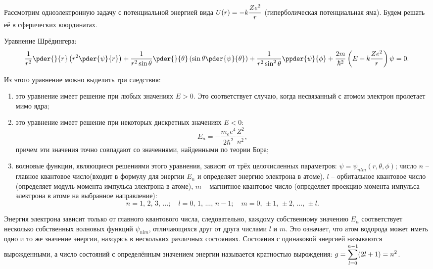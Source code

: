 
Рассмотрим одноэлектронную задачу с потенциальной энергией вида
\( \displaystyle U(r) = -k\frac{Ze^2}{r} \) (гиперболическая потенциальная яма). Будем
решать её в сферических координатах.

Уравнение Шрёдингера:
\[
    \frac{1}{r^2}\pder{}{r}\left(r^2\pder{\psi}{r}\right) + \frac{1}{r^2
    \sin\theta}\pder{}{\theta}\left(\sin\theta\pder{\psi}{\theta}\right) +
    \frac{1}{r^2\sin^2\theta}\ppder{\psi}{\phi} + \frac{2m}{\hbar^2}\left(E +
    k\frac{Ze^2}{r}\right)\psi = 0.
\]

Из этого уравнение можно выделить три следствия:
\begin{enumerate}
    \item это уравнение имеет решение при любых значениях \( E > 0 \). Это
    соответствует случаю, когда несвязанный с атомом электрон пролетает мимо
    ядра;
    
    \item это уравнение имеет решение при некоторых дискретных значениях
    \( E < 0 \):
    \[
        E_n = -\frac{m_ee^4}{2\hbar^2}\frac{Z^2}{n^2},
    \]
    причем эти значения точно совпадают со значениями, найденными по теории
    Бора;
    
    \item волновые функции, являющиеся решениями этого уравнения, зависят от
    трёх целочисленных параметров: \( \psi = \psi_{nlm}(r, \theta, \phi) \);
    число \( n \) -- главное квантовое число(входит в формулу для энергии
    \( E_n \) и определяет энергию электрона в атоме), \( l \) -- орбитальное
    квантовое число (определяет модуль момента импульса электрона в атоме),
    \( m \) -- магнитное квантовое число (определяет проекцию момента импульса
    электрона в атоме на выбранное направление):
    \[
        n = 1,\,2,\,3,\,\ldots; \quad l = 0,\,1,\,\ldots,\,n - 1; \quad m = 0,\,
        \pm 1,\,\pm 2,\,\ldots,\,\pm l.
    \]
\end{enumerate}
    
Энергия электрона зависит только от главного квантового числа,
следовательно, каждому собственному значению \( E_n \) соответствует
несколько собственных волновых функций \( \psi_{nlm} \), отличающихся друг
от друга числами \( l \) и \( m \). Это означает, что атом водорода может
иметь одно и то же значение энергии, находясь в нескольких различных
состояниях. Состояния с одинаковой энергией называются вырожденными, а число
состояний с определённым значением энергии называется кратностью вырождения:
\( \displaystyle g = \sum_{l = 0}^{n-1} (2l + 1) = n^2 \).
    
